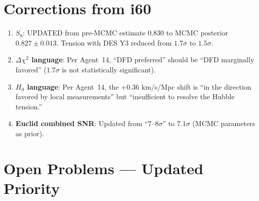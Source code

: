 \documentclass[11pt,a4paper]{article}
\begin{document}
\section{Corrections from i60}
\label{sec:corrections}

\begin{enumerate}
\item \textbf{$S_8$}: UPDATED from pre-MCMC estimate $0.830$ to MCMC posterior $0.827 \pm 0.013$. Tension with DES Y3 reduced from $1.7\sigma$ to $1.5\sigma$.

\item \textbf{$\Delta\chi^2$ language}: Per Agent~14, ``DFD preferred'' should be ``DFD marginally favored'' ($1.7\sigma$ is not statistically significant).

\item \textbf{$H_0$ language}: Per Agent~14, the $+0.36$ km/s/Mpc shift is ``in the direction favored by local measurements'' but ``insufficient to resolve the Hubble tension.''

\item \textbf{Euclid combined SNR}: Updated from ``$7$--$8\sigma$'' to $7.1\sigma$ (MCMC parameters as prior).
\end{enumerate}


\section{Open Problems --- Updated Priority}
\label{sec:open}
\end{document}
